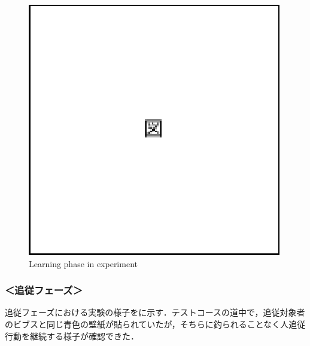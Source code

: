   \begin{figure}[h]
    \centering
    \includegraphics[keepaspectratio, scale=0.80] {images/eps/figure}
    \captionsetup{justification=raggedright} %
    \caption{Learning phase in experiment}
    \label{Fig:Learning phase in experiment}
  \end{figure}

\newpage

  \subsubsection*{＜追従フェーズ＞}
  
  追従フェーズにおける実験の様子をに示す．テストコースの道中で，追従対象者のビブスと同じ青色の壁紙が貼られていたが，そちらに釣られることなく人追従行動を継続する様子が確認できた．

